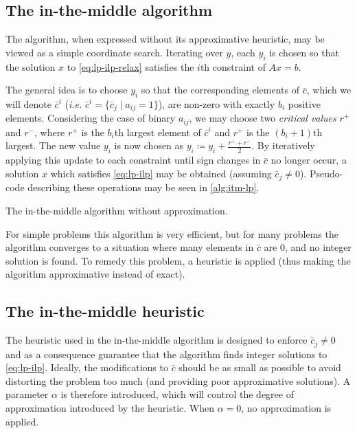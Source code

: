 \subsection{The in-the-middle algorithm}
The algorithm, when expressed without its approximative heuristic, may be viewed as a simple coordinate search.
Iterating over \(y\), each \(y_i\) is chosen so that the solution \(x\) to \eqref{eq:lp-ilp-relax} satisfies the \(i\)th constraint of \(Ax=b\).

The general idea is to choose \(y_i\) so that the corresponding elements of \(\bar{c}\), which we will denote \(\bar{c}^i\) (\emph{i.e.} \(\bar{c}^i = \{\bar{c}_j \mid a_{ij} = 1\}\)), are non-zero with exactly \(b_i\) positive elements.
Considering the case of binary \(a_{ij}\), we may choose two \emph{critical values} \(r^+\) and \(r^-\), where \(r^+\) is the \(b_i\)th largest element of \(\bar{c}^i\) and \(r^+\) is the \((b_i+1)\)th largest.
The new value \(y_i\) is now chosen as \(y_i \coloneq y_i + \frac{r^+ + r^-}{2}\).
By iteratively applying this update to each constraint until sign changes in \(\bar{c}\) no longer occur, a solution \(x\) which satisfies \eqref{eq:lp-ilp} may be obtained (assuming \(\bar{c}_j\neq0\)).
Pseudo-code describing these operations may be seen in \cref{alg:itm-lp}.

\begin{algorithm}[tbp]

	\caption{The in-the-middle algorithm without approximation.}
	\label{alg:itm-lp}
\end{algorithm}

For simple problems this algorithm is very efficient, but for many problems the algorithm converges to a situation where many elements in \(\bar{c}\) are \(0\), and no integer solution is found.
To remedy this problem, a heuristic is applied (thus making the algorithm approximative instead of exact).

\subsection{The in-the-middle heuristic}
The heuristic used in the in-the-middle algorithm is designed to enforce \(\bar{c}_j\neq0\) and as a consequence guarantee that the algorithm finds integer solutions to \eqref{eq:lp-ilp}.
Ideally, the modifications to \(\bar{c}\) should be as small as possible to avoid distorting the problem too much (and providing poor approximative solutions).
A parameter \(\alpha\) is therefore introduced, which will control the degree of approximation introduced by the heuristic.
When \(\alpha=0\), no approximation is applied.

